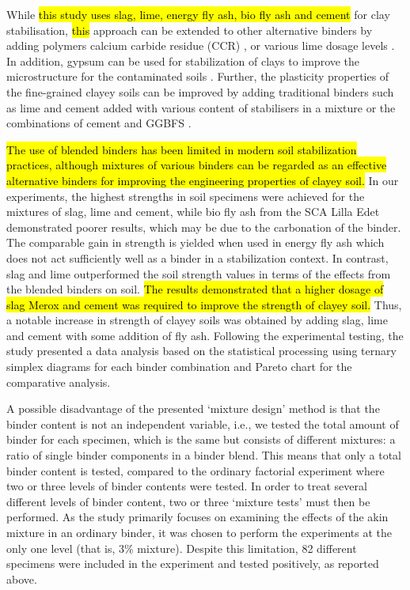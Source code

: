\documentclass[constrmater,article,submit,pdftex,moreauthors]{Definitions/mdpi}
\begin{document}
While \hl{this study uses slag, lime, energy fly ash, bio fly ash and cement} for clay stabilisation, \hl{this} approach can be extended to\hl{ }other alternative binders by adding polymers \cite{Rezaeimalek} calcium carbide residue (CCR) \cite{Horpibulsuk}, or\hl{ }various lime dosage levels \cite{Pedarla}. In addition, gypsum can be used for stabilization of clays to improve the microstructure\hl{ }for the contaminated soils \cite{Latifi}. Further, the plasticity properties of the fine-grained clayey soils can be improved by adding traditional binders such as lime and cement\hl{ }added with various content of stabilisers in a mixture \cite{Mutaz,Rogers} or the combinations of cement and GGBFS \cite{Andersson}.

\hl{The use of blended binders has been limited in modern soil stabilization practices, although mixtures of various binders can be regarded as an effective alternative  binders for improving the engineering properties of clayey soil. }In our experiments, the highest strengths in soil specimens were achieved for the mixtures of slag, lime and cement, while bio fly ash from the SCA Lilla Edet demonstrated poorer results, which may be due to the carbonation of the binder. The comparable gain in strength is yielded when used in energy fly ash which does not act sufficiently well as a binder in a stabilization context. In contrast, slag and lime outperformed the soil strength values in terms of the effects from the blended binders on soil. \hl{The results demonstrated that a higher dosage of slag Merox and cement was required to improve the strength of clayey soil. }Thus, a notable increase in strength of clayey soils was obtained by adding slag, lime and cement with some addition of fly ash. Following the experimental testing, the study presented a data analysis based on the statistical processing using ternary simplex diagrams for each binder combination and Pareto chart for the comparative analysis. 

A possible disadvantage of the presented ‘mixture design’ method is that the binder content is not an independent variable, i.e., we tested the total amount of binder for each specimen, which is the same but consists of different mixtures: a ratio of single binder components in a binder blend. This means that only a total binder content is tested, compared to the ordinary factorial experiment where two or three levels of binder contents were tested. In order to treat several different levels of binder content, two or three ‘mixture tests’ must then be performed. As the study primarily focuses on examining the effects of the akin mixture in an ordinary binder, it was chosen to perform the experiments at the only one level (that is, 3\% mixture). Despite this limitation, 82 different specimens were included in the experiment and tested positively, as reported above. 
\end{document}
